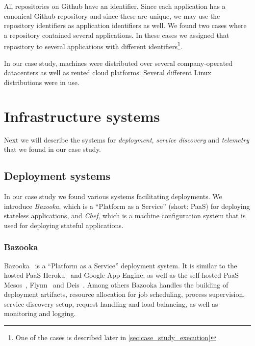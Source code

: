 All repositories on Github have an identifier. Since each application has a canonical Github repository and since these are unique, we may use the repository identifiers as application identifiers as well. We found two cases where a repository contained several applications. In these cases we assigned that repository to several applications with different identifiers\footnote{One of the cases is described later in \autoref{sec:case_study_execution}}.

%
%

In our case study, machines were distributed over several company-operated datacenters as well as rented cloud platforms. Several different Linux distributions were in use.

\section{Infrastructure systems}

Next we will describe the systems for \emph{deployment}, \emph{service discovery} and \emph{telemetry} that we found in our case study.

\subsection{Deployment systems}
\label{subsec:deploymentsys}

In our case study we found various systems facilitating deployments. We introduce \emph{Bazooka}, which is a ``Platform as a Service'' (short: PaaS) for deploying stateless applications, and \emph{Chef}, which is a machine configuration system that is used for deploying stateful applications.

\subsubsection{Bazooka}

Bazooka~\cite{bazookaTalkGoto} is a ``Platform as a Service'' deployment system. It is similar to the hosted PaaS Heroku~\cite{heroku} and Google App Engine\cite{GAE}, as well as the self-hosted PaaS Mesos~\cite{mesos}, Flynn~\cite{flynn} and Deis~\cite{Deis}. Among others Bazooka handles the building of deployment artifacts, resource allocation for job scheduling, process supervision, service discovery setup, request handling and load balancing, as well as monitoring and logging.

